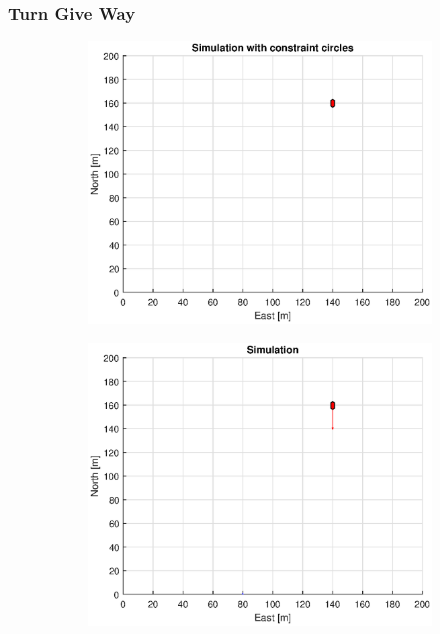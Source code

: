 \subsubsection{Turn Give Way}
\begin{figure}[!b] %
    \begin{subfigure}[b]{0.49\textwidth}
        \centering
        \includegraphics[width=\textwidth]{Images/Figures/sving_GW/Simple0_f1_Frame1}
    \end{subfigure}
    \hfill
    \begin{subfigure}[b]{0.499\textwidth}
        \centering
        \includegraphics[width=\textwidth]{Images/Figures/sving_GW/Simple0_f600_Frame1}

\end{subfigure}
\end{figure}
